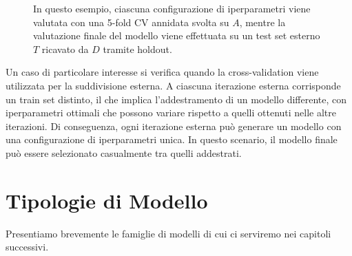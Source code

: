 \begin{figure}[h]
    \centering
    \begin{center}
\end{center}
    \caption{In questo esempio, ciascuna configurazione di iperparametri viene valutata con una 5-fold CV annidata svolta su $A$, mentre la valutazione finale del modello viene effettuata su un test set esterno $T$ ricavato da $D$ tramite holdout.}
    \label{fig:cv-annidata}
\end{figure}

Un caso di particolare interesse si verifica quando la cross-validation viene utilizzata per la suddivisione esterna. A ciascuna iterazione esterna corrisponde un train set distinto, il che implica l'addestramento di un modello differente, con iperparametri ottimali che possono variare rispetto a quelli ottenuti nelle altre iterazioni. Di conseguenza, ogni iterazione esterna può generare un modello con una configurazione di iperparametri unica. In questo scenario, il modello finale può essere selezionato casualmente tra quelli addestrati.








\section{Tipologie di Modello}
\label{par:tipologie}
Presentiamo brevemente le famiglie di modelli di cui ci serviremo nei capitoli successivi.

